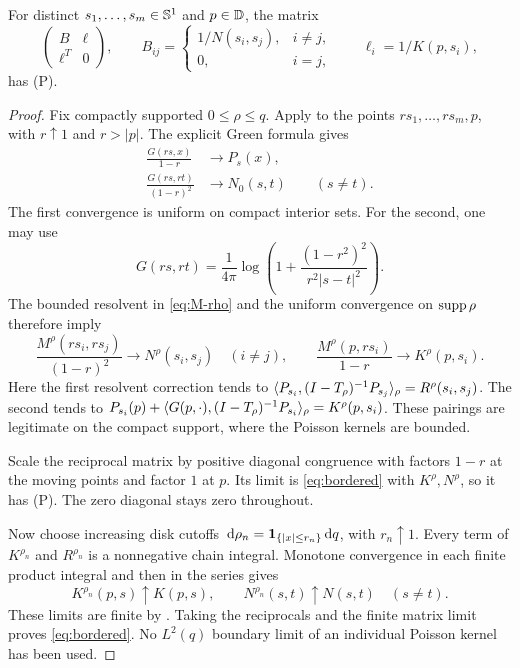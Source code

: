 \begin{lemma}\label{lem:bordered}
For distinct $s_1,\ldots,s_m\in\mathbb S^1$ and $p\in\mathbb D$, the matrix
\begin{equation}\label{eq:bordered}
\begin{pmatrix}B&\ell\\\ell^T&0\end{pmatrix},
\qquad
B_{ij}=\begin{cases}1/N(s_i,s_j),&i\ne j,\\0,&i=j,\end{cases}
\qquad \ell_i=1/K(p,s_i),
\end{equation}
has \textup{(P)}.
\end{lemma}
\begin{proof}
Fix compactly supported $0\le\rho\le q$. Apply  to the points $r s_1,\ldots,r s_m,p$, with $r\uparrow1$ and $r>|p|$. The explicit Green formula gives
\begin{align}
\frac{G(rs,x)}{1-r}&\longrightarrow P_s(x),\label{eq:radial-one}\\
\frac{G(rs,rt)}{(1-r)^2}&\longrightarrow N_0(s,t)\qquad(s\ne t).\label{eq:radial-two}
\end{align}
The first convergence is uniform on compact interior sets. For the second, one may use
\[
G(rs,rt)=\frac1{4\pi}\log\left(1+\frac{(1-r^2)^2}{r^2|s-t|^2}\right).
\]
The bounded resolvent in \eqref{eq:M-rho} and the uniform convergence on $\operatorname{supp}\rho$ therefore imply
\[
\frac{M^\rho(rs_i,rs_j)}{(1-r)^2}\longrightarrow N^\rho(s_i,s_j)
\quad(i\ne j),\qquad
\frac{M^\rho(p,rs_i)}{1-r}\longrightarrow K^\rho(p,s_i).
\]
Here the first resolvent correction tends to
$\langle P_{s_i},(I-T_\rho)^{-1}P_{s_j}\rangle_\rho=R^\rho(s_i,s_j)$.
The second tends to
$P_{s_i}(p)+\langle G(p,\cdot),(I-T_\rho)^{-1}P_{s_i}\rangle_\rho=K^\rho(p,s_i)$.
These pairings are legitimate on the compact support, where the Poisson kernels are bounded.

Scale the reciprocal matrix by positive diagonal congruence with factors $1-r$ at the moving points and factor $1$ at $p$. Its limit is \eqref{eq:bordered} with $K^\rho,N^\rho$, so it has \textup{(P)}. The zero diagonal stays zero throughout.

Now choose increasing disk cutoffs $\,\mathrm d\rho_n=\mathbf 1_{\{|x|\le r_n\}}\,\mathrm d q$, with $r_n\uparrow1$. Every term of $K^{\rho_n}$ and $R^{\rho_n}$ is a nonnegative chain integral. Monotone convergence in each finite product integral and then in the series gives
\[
K^{\rho_n}(p,s)\uparrow K(p,s),\qquad
N^{\rho_n}(s,t)\uparrow N(s,t)\quad(s\ne t).
\]
These limits are finite by . Taking the reciprocals and the finite matrix limit proves \eqref{eq:bordered}. No $L^2(q)$ boundary limit of an individual Poisson kernel has been used.
\end{proof}

